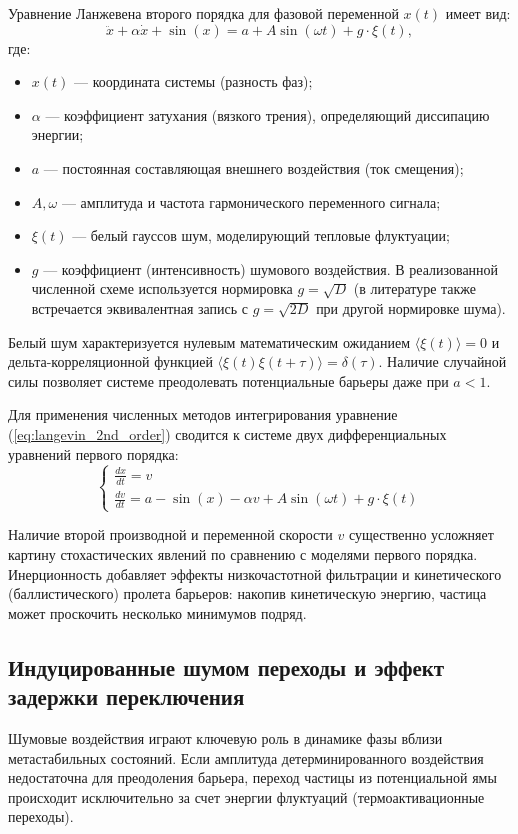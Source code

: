 Уравнение Ланжевена второго порядка для фазовой переменной $x(t)$ имеет вид:
\begin{equation}
    \ddot{x} + \alpha\dot{x} + \sin(x) = a + A \sin(\omega t) + g\cdot\xi(t),
    \label{eq:langevin_2nd_order}
\end{equation}
где:
\begin{itemize}
    \item $x(t)$ — координата системы (разность фаз);
    \item $\alpha$ — коэффициент затухания (вязкого трения), определяющий диссипацию энергии;
    \item $a$ — постоянная составляющая внешнего воздействия (ток смещения);
    \item $A, \omega$ — амплитуда и частота гармонического переменного сигнала;
    \item $\xi(t)$ — белый гауссов шум, моделирующий тепловые флуктуации;
    \item $g$ — коэффициент (интенсивность) шумового воздействия. В реализованной численной схеме используется нормировка $g = \sqrt{D}$ (в литературе также встречается эквивалентная запись с $g=\sqrt{2D}$ при другой нормировке шума).
\end{itemize}

Белый шум характеризуется нулевым математическим ожиданием $\langle\xi(t)\rangle = 0$ и дельта-корреляционной функцией $\langle\xi(t)\xi(t + \tau)\rangle = \delta(\tau)$. Наличие случайной силы позволяет системе преодолевать потенциальные барьеры даже при $a < 1$.

Для применения численных методов интегрирования уравнение (\ref{eq:langevin_2nd_order}) сводится к системе двух дифференциальных уравнений первого порядка:
\begin{equation}
\begin{cases}
    \frac{dx}{dt} = v \\
    \frac{dv}{dt} = a - \sin(x) - \alpha v + A \sin(\omega t) + g\cdot\xi(t)
\end{cases}
\label{eq:langevin_system}
\end{equation}

Наличие второй производной и переменной скорости $v$ существенно усложняет картину стохастических явлений по сравнению с моделями первого порядка. Инерционность добавляет эффекты низкочастотной фильтрации и кинетического (баллистического) пролета барьеров: накопив кинетическую энергию, частица может проскочить несколько минимумов подряд.

\subsection{Индуцированные шумом переходы и эффект задержки переключения}
Шумовые воздействия играют ключевую роль в динамике фазы вблизи метастабильных состояний. Если амплитуда детерминированного воздействия недостаточна для преодоления барьера, переход частицы из потенциальной ямы происходит исключительно за счет энергии флуктуаций (термоактивационные переходы).

